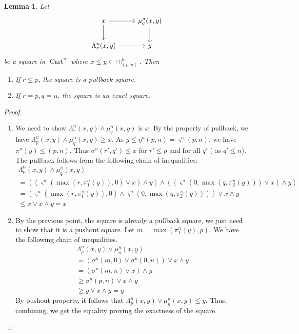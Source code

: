 \documentclass[14pt]{article}
\newtheorem{lemma}[theorem]{Lemma}
\theoremstyle{definition}
\newcommand{\op}[1]{\operatorname{#1}}
\numberwithin{subsection}{section}
\begin{document}
\begin{lemma}
    Let 
    \begin{equation}
        \begin{tikzcd}
            x \arrow[r] \arrow[d] & \mu^n_q(x,y) \arrow[d] \\
            \Lambda^n_r(x,y) \arrow[r] & y
        \end{tikzcd}
    \end{equation}
    be a square in $\op{Cart}^n$ where $ x\le y \in \boxplus^n_{(p,n)}$. Then
    \begin{enumerate}
        \item If $r \le p$, the square is a pullback square.
        \item If $ r= p , q =n$, the square is an exact square.
    \end{enumerate}
    
\end{lemma}
\begin{proof}
\begin{enumerate}
    \item  We need to show $\Lambda^n_r(x,y) \wedge \mu^n_q(x,y)$ is $x$. By the property of pullback, we have $\Lambda^n_p(x,y) \wedge \mu^n_q(x,y) \ge x$. As $y \le \eta^n(p,n) =\varsigma^n(p,n)$, we have $\pi^n(y) \le (p,n)$. Thus $\sigma^n(r',q') \le x$ for $r' \le p$ and for all $q'$ ( as $q' \le n$). The pullback follows from the following chain of inequalities:
    \begin{align*}
        \Lambda^n_p(x,y) \wedge \mu^n_q(x,y)\\ = ((\varsigma^n(\op{max}(r,\pi^n_1(y)),0) \vee x) \wedge y) \wedge ((\varsigma^n(0,\op{max}(q,\pi^n_2(y))) \vee x) \wedge y) \\= (\varsigma^n(\op{max}(r,\pi^n_1(y)),0) \wedge \varsigma^n(0,\op{max}(q,\pi^n_2(y)))) \vee x \wedge y \\ \le x \vee x \wedge y = x
    \end{align*}
    \item By the previous point, the square is already a pullback square, we just need to show that it is a pushout square. Let $m = \op{max}(\pi^n_1(y),p)$. We have the following chain of inequalities. 
   \begin{align*}
       \Lambda^n_p(x,y) \vee \mu^n_n(x,y) \\= (\sigma^n(m,0) \vee \sigma^n(0,n)) \vee x \wedge y \\ = (\sigma^n(m,n) \vee x ) \wedge y  \\ \ge \sigma^n(p,n) \vee x \wedge y \\ \ge y \vee x \wedge y= y
   \end{align*}
   By pushout property, it follows that $\Lambda^n_p(x,y) \vee \mu^n_n(x,y) \le y$. Thus, combining, we get the equality proving the exactness of the square.
   \end{enumerate} 
\end{proof}
\end{document}
